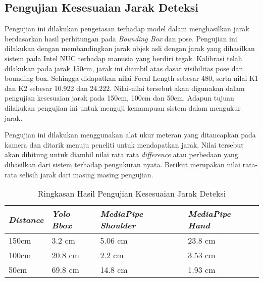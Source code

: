 \subsection{Pengujian Kesesuaian Jarak Deteksi}

Pengujian ini dilakukan pengetasan terhadap model dalam menghasilkan jarak berdasarkan hasil perhitungan pada \emph{Bounding Box} dan pose. Pengujian ini dilakukan dengan membandingkan jarak objek asli dengan jarak yang dihasilkan sistem pada Intel NUC terhadap manusia yang berdiri tegak. Kalibrasi telah dilakukan pada jarak 150cm, jarak ini diambil atas dasar visibilitas pose dan bounding box. Sehingga didapatkan nilai Focal Length sebesar 480, serta nilai K1 dan K2 sebesar 10.922 dan 24.222. Nilai-nilai tersebut akan digunakan dalam pengujian kesesuaian jarak pada 150cm, 100cm dan 50cm. Adapun tujuan dilakukan pengujian ini untuk menguji kemampuan sistem dalam mengukur jarak.

Pengujian ini dilakukan menggunakan alat ukur meteran yang ditancapkan pada kamera dan ditarik menuju peneliti untuk mendapatkan jarak. Nilai tersebut akan dihitung untuk diambil nilai rata rata \emph{difference} atau perbedaan yang dihasilkan dari sistem terhadap pengukuran nyata. Berikut merupakan nilai rata-rata selisih jarak dari masing masing pengujian.

\begin{table}[H]
    \centering
    \caption{Ringkasan Hasil Pengujian Kesesuaian Jarak Deteksi}
    \label{tb:ringkasan_pengukuran_kesesuaian}
    \begin{tabular}{|l|l|l|l|}
    \hline
    \textit{Distance} & \textit{Yolo Bbox} & \textit{MediaPipe Shoulder} & \textit{MediaPipe Hand} \\ \hline
    150cm & 3.2 cm & 5.06 cm & 23.8 cm \\ \hline
    100cm & 20.8 cm & 2.2 cm & 3.53 cm \\ \hline
    50cm & 69.8 cm & 14.8 cm & 1.93 cm \\ \hline
    \end{tabular}
\end{table}


